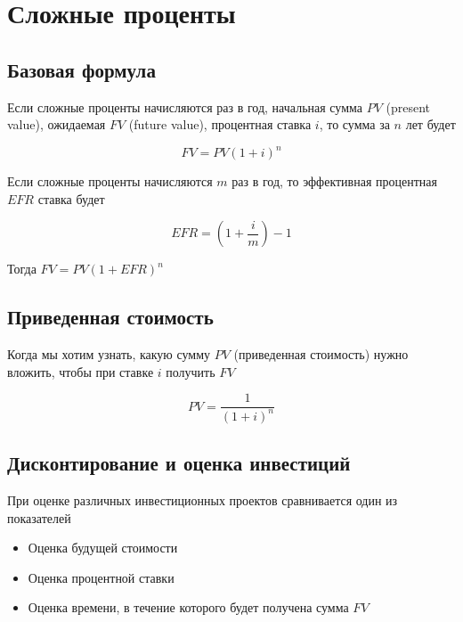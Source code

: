 \section{Сложные проценты}

\subsection{Базовая формула}

Если сложные проценты начисляются раз в год, начальная сумма $ PV $ (present value), ожидаемая $ FV $ (future value), процентная ставка $ i $, то сумма за $ n $ лет будет

$$
FV = PV(1 + i)^{n}
$$

Если сложные проценты начисляются $ m $ раз в год, то эффективная процентная $ EFR $ ставка будет

$$ 
EFR = (1 + \dfrac{i}{m}) - 1
$$

Тогда $ FV = PV(1 + EFR)^{n} $

\subsection{Приведенная стоимость}

Когда мы хотим узнать, какую сумму $ PV $ (приведенная стоимость) нужно вложить, чтобы при ставке $ i $ получить $ FV $

$$
PV = \dfrac{1}{(1+i)^{n}}
$$

\subsection{Дисконтирование и оценка инвестиций}

При оценке различных инвестиционных проектов сравнивается один из показателей

\begin{itemize}
\item 
Оценка будущей стоимости

\item 
Оценка процентной ставки

\item 
Оценка времени, в течение которого будет получена сумма $ FV $

\end{itemize}